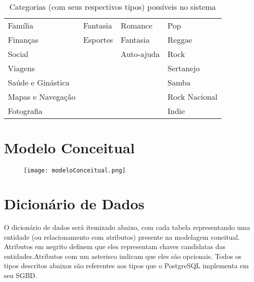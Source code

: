 \documentclass[a4paper, 11pt]{article}
\begin{document}
\begin{table}[H]
{\begin{tabular}{@{}llll@{}}
\multicolumn{1}{l|}{Família} & 
\multicolumn{1}{l|}{Fantasia} & \multicolumn{1}{l|}{Romance} & Pop \\[5pt]

\multicolumn{1}{l|}{Finanças} & 
\multicolumn{1}{l|}{Esportes} & \multicolumn{1}{l|}{Fantasia} & Reggae \\[5pt]

\multicolumn{1}{l|}{Social} & 
\multicolumn{1}{l|}{} & \multicolumn{1}{l|}{Auto-ajuda} & Rock \\[5pt]

\multicolumn{1}{l|}{Viagens} & 
\multicolumn{1}{l|}{} & \multicolumn{1}{l|}{} & Sertanejo \\[5pt]

\multicolumn{1}{l|}{Saúde e Ginástica} & 
\multicolumn{1}{l|}{} & \multicolumn{1}{l|}{} & Samba \\[5pt]

\multicolumn{1}{l|}{Mapas e Navegação} & 
\multicolumn{1}{l|}{} & \multicolumn{1}{l|}{} & Rock Nacional \\[5pt]

\multicolumn{1}{l|}{Fotografia} & 
\multicolumn{1}{l|}{} & \multicolumn{1}{l|}{} & Indie \\ \bottomrule
\end{tabular}%
}
\caption{Categorias (com seus respectivos tipos) possíveis no sistema}
\end{table}


\newpage
\section*{Modelo Conceitual}
\begin{figure}[H]
\texttt{[image: modeloConceitual.png]}
\end{figure}

\newpage
\section*{Dicionário de Dados}
O dicionário de dados será itemizado abaixo, com cada tabela representando uma entidade (ou relacionamento com atributos) presente na modelagem coneitual. \\
Atributos em negrito definem que eles representam chaves candidatas das entidades.Atributos com um asterisco indicam que eles são opcionais. Todos os tipos descritos abaixos são referentes aos tipos que o PostgreSQL implementa em seu SGBD.
\end{document}
